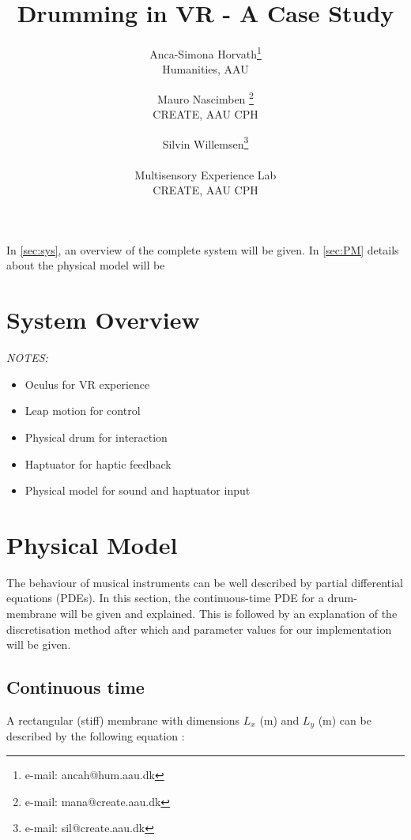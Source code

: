 \documentclass{vgtc}
\title{Drumming in VR - A Case Study}
\author{Anca-Simona Horvath\thanks{e-mail: ancah@hum.aau.dk}\\ %
        \scriptsize Humanities, AAU %
\and Mauro Nascimben \thanks{e-mail: mana@create.aau.dk}\\ %
     \scriptsize CREATE, AAU CPH %
\and Silvin Willemsen\thanks{e-mail: sil@create.aau.dk}\\ %
     \parbox{1.4in}{\scriptsize \centering Multisensory Experience Lab \\ CREATE, AAU CPH}}
\begin{document}


\maketitle

In \autoref{sec:sys}, an overview of the complete system will be given. In \autoref{sec:PM} details about the physical model will be 

\section{System Overview} \label{sec:sys}
\textit{NOTES:}
\begin{itemize}
    \item Oculus for VR experience
    \item Leap motion for control
    \item Physical drum for interaction
    \item Haptuator for haptic feedback
    \item Physical model for sound and haptuator input
\end{itemize}

\section{Physical Model}\label{sec:PM}
The behaviour of musical instruments can be well described by partial differential equations (PDEs). In this section, the continuous-time PDE for a drum-membrane will be given and explained. This is followed by an explanation of the discretisation method after which and parameter values for our implementation will be given. 

\subsection{Continuous time}
A rectangular (stiff) membrane with dimensions $L_x$ (m) and $L_y$ (m) can be described by the following equation \cite{bilbao2009numerical}:
\end{document}
